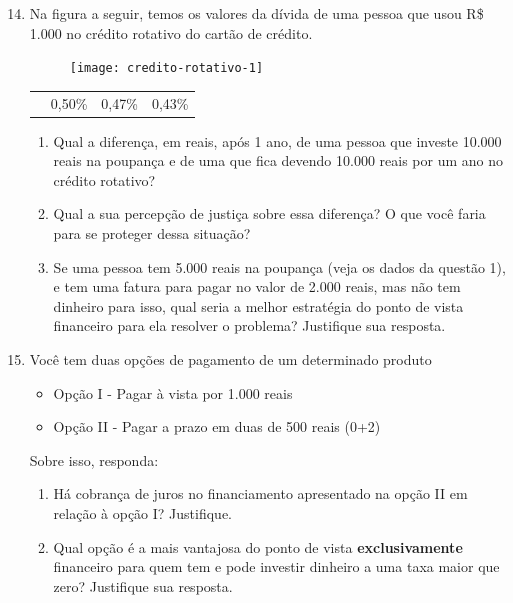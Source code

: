 \begin{enumerate}\setcounter{enumi}{13}
\item Na figura a seguir, temos os valores da dívida de uma pessoa que usou R\$ 1.000 no crédito rotativo do cartão de crédito.

\begin{multicols}{2}

\begin{figure}[H]
\centering

\texttt{[image: credito-rotativo-1]}
\end{figure}
\columnbreak
\null\vfill

\begin{table}[H]
\centering

\begin{tabu} to \textwidth{|c|c|c|c|}
\hhline{~|---|}
 &  &  &  \\
\hline
{} & 0,50\% & 0,47\% & 0,43\% \\
\hline
\end{tabu}
\end{table}
\vfill\null
\end{multicols}

\begin{enumerate}
\item Qual a diferença, em reais, após 1 ano, de uma pessoa que investe 10.000 reais na poupança e de uma que fica devendo 10.000 reais por um ano no crédito rotativo? 
\item Qual a sua percepção de justiça sobre essa diferença? O que você faria para se proteger dessa situação?

\item Se uma pessoa tem 5.000 reais na poupança (veja os dados da questão 1), e tem uma fatura para pagar no valor de 2.000 reais, mas não tem dinheiro para isso, qual seria a melhor estratégia do ponto de vista financeiro para ela resolver o problema? Justifique sua resposta.
\end{enumerate}

\item Você tem duas opções de pagamento de um determinado produto
\begin{itemize}
\item Opção I - Pagar à vista por 1.000 reais
\item Opção II - Pagar a prazo em duas de 500 reais (0+2)
\end{itemize}

Sobre isso, responda:
\begin{enumerate}
\item Há cobrança de juros no financiamento apresentado na opção II em relação à opção I? Justifique.
\item Qual opção é a mais vantajosa do ponto de vista \textbf{exclusivamente} financeiro para quem tem e pode investir dinheiro a uma taxa maior que zero? Justifique sua resposta.
\end{enumerate}
\end{enumerate}
